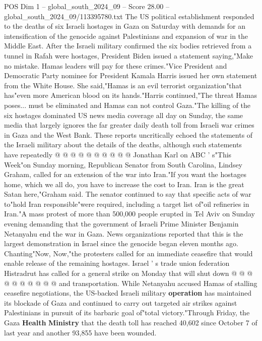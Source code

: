 \begin{textsample}{POS Dim 1 – global\_south\_2024\_09 – Score 28.00 – global\_south\_2024\_09/113395780.txt}  \label{ex:f1_pos_206}
The US political establishment responded to the deaths of six Israeli hostages in Gaza on Saturday with demands for an intensification of the genocide against Palestinians and expansion of war in the Middle East.
After the Israeli military confirmed the six bodies retrieved from a tunnel in Rafah were hostages, President Biden issued a statement saying,"Make no mistake.
Hamas leaders will pay for these crimes."Vice President and Democratic Party nominee for President Kamala Harris issued her own statement from the White House.
She said,"Hamas is an evil terrorist organization"that has"even more American blood on its hands."Harris continued,"The threat Hamas poses... must be eliminated and Hamas can not control Gaza."The killing of the six hostages dominated US news media coverage all day on Sunday, the same media that largely ignores the far greater daily death toll from Israeli war crimes in Gaza and the West Bank.
These reports uncritically echoed the statements of the Israeli military about the details of the deaths, although such statements have repeatedly @ @ @ @ @ @ @ @ @ @ Jonathan Karl on ABC ' s"This Week"on Sunday morning, Republican Senator from South Carolina, Lindsey Graham, called for an extension of the war into Iran."If you want the hostages home, which we all do, you have to increase the cost to Iran.
Iran is the great Satan here,"Graham said.
The senator continued to say that specific acts of war to"hold Iran responsible"were required, including a target list of"oil refineries in Iran."A mass protest of more than 500,000 people erupted in Tel Aviv on Sunday evening demanding that the government of Israeli Prime Minister Benjamin Netanyahu end the war in Gaza.
News organizations reported that this is the largest demonstration in Israel since the genocide began eleven months ago.
Chanting"Now, Now,"the protesters called for an immediate ceasefire that would enable release of the remaining hostages.
Israel ' s trade union federation Histradrut has called for a general strike on Monday that will shut down @ @ @ @ @ @ @ @ @ @ and transportation.
While Netanyahu accused Hamas of stalling ceasefire negotiations, the US-backed Israeli military \textbf{operation} has maintained its blockade of Gaza and continued to carry out targeted air strikes against Palestinians in pursuit of its barbaric goal of"total victory."Through Friday, the Gaza \textbf{Health} \textbf{Ministry} that the death toll has reached 40,602 since October 7 of last year and another 93,855 have been wounded.

\end{textsample}
